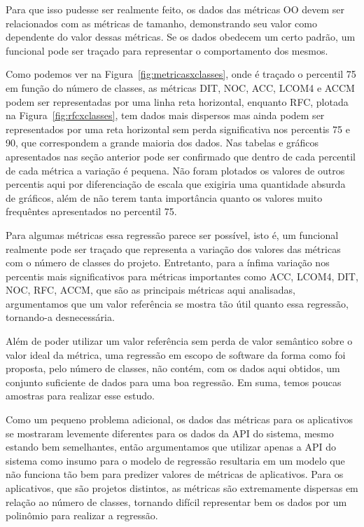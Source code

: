Para que isso pudesse ser realmente feito, os dados das métricas OO devem ser relacionados com as métricas de tamanho, demonstrando seu valor como dependente do valor dessas métricas. Se os dados obedecem um certo padrão, um funcional pode ser traçado para representar o comportamento dos mesmos. 

Como podemos ver na Figura~\ref{fig:metricasxclasses}, onde é traçado o percentil 75 em função do número de classes, as métricas DIT, NOC, ACC, LCOM4 e ACCM podem ser representadas por uma linha reta horizontal, enquanto RFC, plotada na Figura~\ref{fig:rfcxclasses}, tem dados mais dispersos mas ainda podem ser representados por uma reta horizontal sem perda significativa nos percentis 75 e 90, que correspondem a grande maioria dos dados. Nas tabelas e gráficos apresentados nas seção anterior pode ser confirmado que dentro de cada percentil de cada métrica a variação é pequena. Não foram plotados os valores de outros percentis aqui por diferenciação de escala que exigiria uma quantidade absurda de gráficos, além de não terem tanta importância quanto os valores muito frequêntes apresentados no percentil 75.

Para algumas métricas essa regressão parece ser possível, isto é, um funcional realmente pode ser traçado que representa a variação dos valores das métricas com o número de classes do projeto. Entretanto, para a ínfima variação nos percentis mais significativos para métricas importantes como ACC, LCOM4, DIT, NOC, RFC, ACCM, que são as principais métricas aqui analisadas, argumentamos que um valor referência se mostra tão útil quanto essa regressão, tornando-a desnecessária.

Além de poder utilizar um valor referência sem perda de valor semântico sobre o valor ideal da métrica, uma regressão em escopo de software da forma como foi proposta, pelo número de classes, não contém, com os dados aqui obtidos, um conjunto suficiente de dados para uma boa regressão. Em suma, temos poucas amostras para realizar esse estudo.

Como um pequeno problema adicional, os dados das métricas para os aplicativos se mostraram levemente diferentes para os dados da API do sistema, mesmo estando bem semelhantes, então argumentamos que utilizar apenas a API do sistema como insumo para o modelo de regressão resultaria em um modelo que não funciona tão bem para predizer valores de métricas de aplicativos. Para os aplicativos, que são projetos distintos, as métricas são extremamente dispersas em relação ao número de classes, tornando difícil representar bem os dados por um polinômio para realizar a regressão. 

